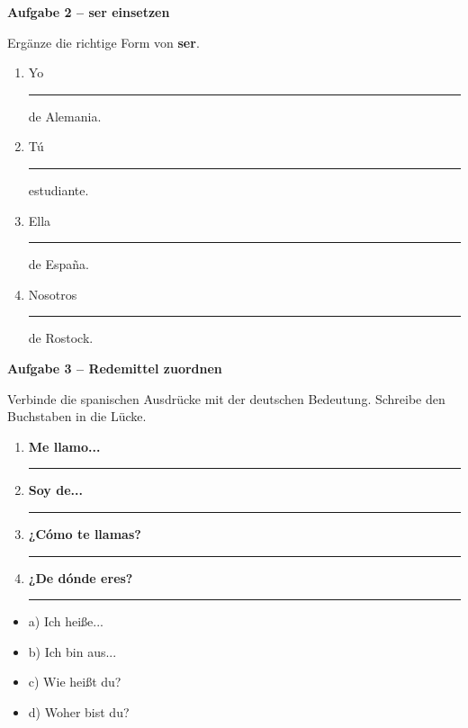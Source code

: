 \documentclass[11pt, a4paper]{article}
\newcommand{\punktebox}[1]{\hfill\fbox{\small \_\_\_/#1}}
\newcommand{\luecke}[1]{\rule{#1}{0.4pt}}
\newcommand{\es}[1]{\textcolor{spanisch}{\textbf{#1}}}
\begin{document}
\noindent\textbf{\textcolor{spanisch}{Aufgabe 2 -- ser einsetzen}} \punktebox{8}

\noindent Ergänze die richtige Form von \es{ser}.

\vspace{10pt}

\begin{enumerate}[label=\alph*)]
    \item Yo \luecke{2.5cm} de Alemania.
    \item Tú \luecke{2.5cm} estudiante.
    \item Ella \luecke{2.5cm} de España.
    \item Nosotros \luecke{2.5cm} de Rostock.
\end{enumerate}

\vspace{15pt}


\noindent\textbf{\textcolor{spanisch}{Aufgabe 3 -- Redemittel zuordnen}} \punktebox{6}

\noindent Verbinde die spanischen Ausdrücke mit der deutschen Bedeutung. Schreibe den Buchstaben in die Lücke.

\vspace{10pt}

\begin{minipage}[t]{0.55\textwidth}
\begin{enumerate}[label=\arabic*.]
    \item \es{Me llamo...} \luecke{1cm}
    \item \es{Soy de...} \luecke{1cm}
    \item \es{¿Cómo te llamas?} \luecke{1cm}
    \item \es{¿De dónde eres?} \luecke{1cm}
\end{enumerate}
\end{minipage}
\hfill
\begin{minipage}[t]{0.4\textwidth}
\begin{itemize}[label=]
    \item a) Ich heiße...
    \item b) Ich bin aus...
    \item c) Wie heißt du?
    \item d) Woher bist du?
\end{itemize}
\end{minipage}
\end{document}
